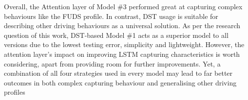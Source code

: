 %
%
Overall, the Attention layer of Model \#3 performed great at capturing complex behaviours like the FUDS profile.
In contrast, DST usage is suitable for describing other driving behaviours as a universal solution.
As per the research question of this work, DST-based Model \#1 acts as a superior model to all versions due to the lowest testing error, simplicity and lightweight.
However, the attention layer's impact on improving LSTM capturing characteristics is worth considering, apart from providing room for further improvements.
Yet, a combination of all four strategies used in every model may lead to far better outcomes in both complex capturing behaviour and generalising other driving profiles

%
%

%
%

%

%
%

